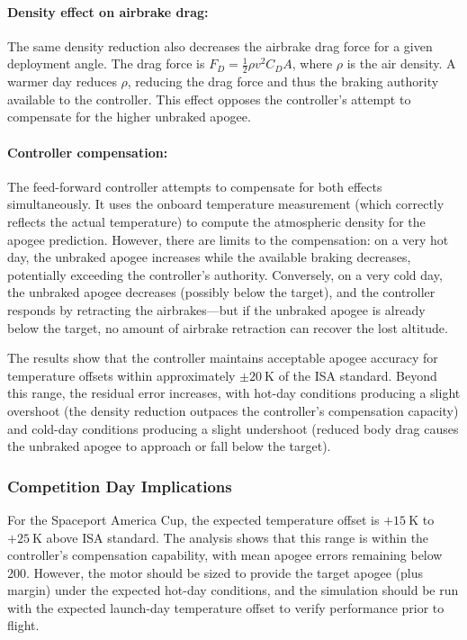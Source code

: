 \documentclass[11pt,letterpaper]{article}
\newcommand{\Cd}{C_D}
\begin{document}
\paragraph{Density effect on airbrake drag:}
The same density reduction also decreases the airbrake drag force for a given deployment angle. The drag force is $F_D = \frac{1}{2} \rho v^2 \Cd A$, where $\rho$ is the air density. A warmer day reduces $\rho$, reducing the drag force and thus the braking authority available to the controller. This effect opposes the controller's attempt to compensate for the higher unbraked apogee.

\paragraph{Controller compensation:}
The feed-forward controller attempts to compensate for both effects simultaneously. It uses the onboard temperature measurement (which correctly reflects the actual temperature) to compute the atmospheric density for the apogee prediction. However, there are limits to the compensation: on a very hot day, the unbraked apogee increases while the available braking decreases, potentially exceeding the controller's authority. Conversely, on a very cold day, the unbraked apogee decreases (possibly below the target), and the controller responds by retracting the airbrakes---but if the unbraked apogee is already below the target, no amount of airbrake retraction can recover the lost altitude.

The results show that the controller maintains acceptable apogee accuracy for temperature offsets within approximately $\pm\SI{20}{\kelvin}$ of the ISA standard. Beyond this range, the residual error increases, with hot-day conditions producing a slight overshoot (the density reduction outpaces the controller's compensation capacity) and cold-day conditions producing a slight undershoot (reduced body drag causes the unbraked apogee to approach or fall below the target).

\subsubsection{Competition Day Implications}

For the Spaceport America Cup, the expected temperature offset is $+\SI{15}{\kelvin}$ to $+\SI{25}{\kelvin}$ above ISA standard. The analysis shows that this range is within the controller's compensation capability, with mean apogee errors remaining below \SI{200}{\ft}. However, the motor should be sized to provide the target apogee (plus margin) under the expected hot-day conditions, and the simulation should be run with the expected launch-day temperature offset to verify performance prior to flight.
\end{document}
